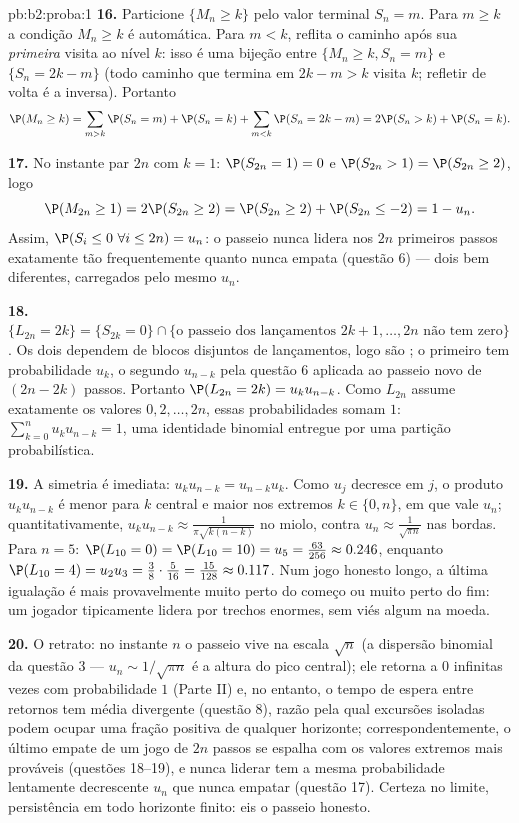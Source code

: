 \begin{solution}{pb:b2:proba:1}
\textbf{16.} Particione $\{M_n \geq k\}$ pelo valor terminal
$S_n = m$. Para $m \geq k$ a condição $M_n \geq k$ é
automática. Para $m < k$, reflita o caminho após sua
\emph{primeira} visita ao nível $k$: isso é uma bijeção entre
$\{M_n \geq k, S_n = m\}$ e $\{S_n = 2k - m\}$ (todo caminho
que termina em $2k - m > k$ visita $k$; refletir de volta é a
inversa). Portanto
\[
\P(M_n \geq k)
= \sum_{m > k}\P(S_n = m) + \P(S_n = k)
+ \sum_{m < k}\P(S_n = 2k - m)
= 2\P(S_n > k) + \P(S_n = k).
\]

\textbf{17.} No instante par $2n$ com $k = 1$: $\P(S_{2n} = 1)
= 0$ e $\P(S_{2n} > 1) = \P(S_{2n} \geq 2)$, logo
\[
\P(M_{2n} \geq 1) = 2\P(S_{2n} \geq 2)
= \P(S_{2n} \geq 2) + \P(S_{2n} \leq -2)
= 1 - u_n .
\]
Assim, $\P(S_i \leq 0\ \forall i \leq 2n) = u_n$: o passeio
nunca lidera nos $2n$ primeiros passos exatamente tão frequentemente quanto
nunca empata (questão 6) --- dois  bem diferentes,
carregados pelo mesmo $u_n$.

\textbf{18.} $\{L_{2n} = 2k\} = \{S_{2k} = 0\} \cap
\{\text{o passeio dos lançamentos } 2k+1, \dots, 2n \text{ não
tem zero}\}$. Os dois  dependem de blocos disjuntos de lançamentos,
logo são ; o primeiro tem probabilidade $u_k$, o
segundo $u_{n-k}$ pela questão 6 aplicada ao passeio novo
de $(2n-2k)$ passos. Portanto $\P(L_{2n} = 2k) = u_ku_{n-k}$.
Como $L_{2n}$ assume exatamente os valores $0, 2, \dots, 2n$,
essas probabilidades somam $1$:
$\sum_{k=0}^nu_ku_{n-k} = 1$, uma identidade binomial entregue
por uma partição probabilística.

\textbf{19.} A simetria é imediata: $u_ku_{n-k} =
u_{n-k}u_k$. Como $u_j$ decresce em $j$, o produto
$u_ku_{n-k}$ é menor para $k$ central e maior nos
extremos $k \in \{0, n\}$, em que vale $u_n$;
quantitativamente, $u_ku_{n-k} \approx \frac1{\pi\sqrt{k(n-k)}}$
no miolo, contra $u_n \approx \frac1{\sqrt{\pi n}}$ nas
bordas. Para $n = 5$: $\P(L_{10} = 0) = \P(L_{10} = 10) =
u_5 = \frac{63}{256} \approx 0.246$, enquanto $\P(L_{10} = 4) =
u_2u_3 = \frac38\cdot\frac5{16} = \frac{15}{128} \approx
0.117$. Num jogo honesto longo, a última igualação é mais
provavelmente muito perto do começo ou muito perto do fim: um jogador
tipicamente lidera por trechos enormes, sem viés algum na
moeda.

\textbf{20.} O retrato: no instante $n$ o passeio vive na escala
$\sqrt n$ (a dispersão binomial da questão 3 --- $u_n \sim
1/\sqrt{\pi n}$ é a altura do pico central); ele
retorna a $0$ infinitas vezes com probabilidade $1$ (Parte
II) e, no entanto, o tempo de espera entre retornos tem média divergente
(questão 8), razão pela qual excursões isoladas podem ocupar uma
fração positiva de qualquer horizonte; correspondentemente, o último
empate de um jogo de $2n$ passos se espalha com os valores extremos
mais prováveis (questões 18--19), e nunca liderar tem a
mesma probabilidade lentamente decrescente $u_n$ que nunca empatar
(questão 17). Certeza no limite, persistência em todo
horizonte finito: eis o passeio honesto.


\end{solution}

